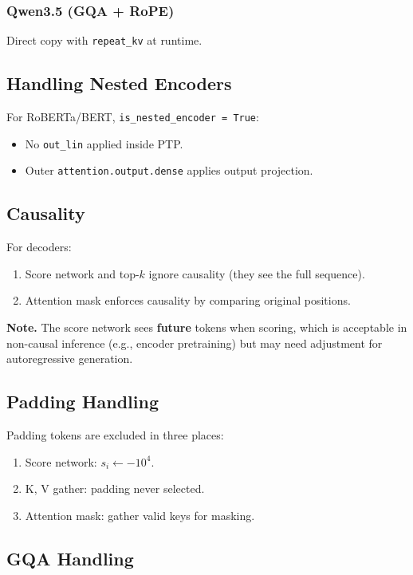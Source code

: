 \subsubsection{Qwen3.5 (GQA + RoPE)}

Direct copy with \texttt{repeat\_kv} at runtime.

\subsection{Handling Nested Encoders}

For RoBERTa/BERT, \texttt{is\_nested\_encoder = True}:
\begin{itemize}
\item No \texttt{out\_lin} applied inside PTP.
\item Outer \texttt{attention.output.dense} applies output projection.

\end{itemize}
\subsection{Causality}

For decoders:
\begin{enumerate}
\item Score network and top-$k$ ignore causality (they see the full sequence).
\item Attention mask enforces causality by comparing original positions.

\end{enumerate}
\textbf{Note.} The score network sees \textbf{future} tokens when scoring, which is 
acceptable in non-causal inference (e.g., encoder pretraining) but may 
need adjustment for autoregressive generation.

\subsection{Padding Handling}

Padding tokens are excluded in three places:
\begin{enumerate}
\item Score network: $s_i \leftarrow -10^4$.
\item K, V gather: padding never selected.
\item Attention mask: gather valid keys for masking.

\end{enumerate}
\subsection{GQA Handling}

